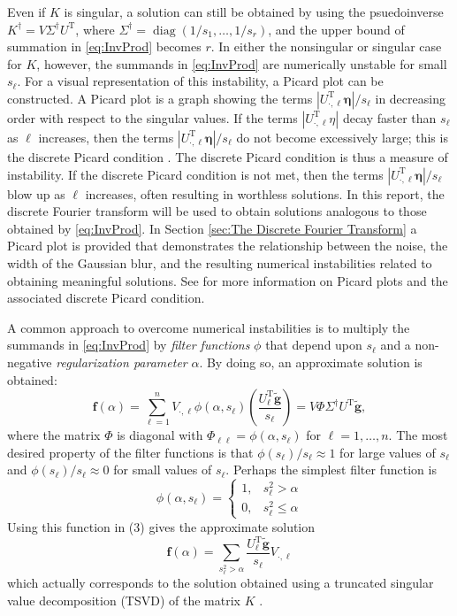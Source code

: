 \documentclass[12pt]{article}
\newcommand{\gnoiseVec}{\widetilde{\mathbf{g}}}	%
\newcommand{\kMat}{K}	%
\newcommand{\fVec}{\mathbf{f}}	%
\newcommand{\trans}{\mathrm{T}}	%
\newcommand{\diag}{\operatorname{diag}}	%
\newcommand{\regparam}{\alpha}
\newcommand{\filt}{\phi}
\newcommand{\noise}{\eta}	%
\newcommand{\noiseVec}{\bm{\noise}}	%
\newcommand{\singular}{s}	%
\begin{document}
Even if $\kMat$ is singular, a solution can still be obtained by using the psuedoinverse $\kMat^\dagger = V{\Sigma^\dagger}U^\trans$, where $\Sigma^\dagger = \diag(1/\singular_1,\ldots,1/\singular_r)$, and the upper bound of summation in \eqref{eq:InvProd} becomes $r$. In either the nonsingular or singular case for $\kMat$, however, the summands in \eqref{eq:InvProd} are numerically unstable for small $\singular_\ell$. For a visual representation of this instability, a Picard plot can be constructed. A Picard plot is a graph showing the terms $|U^\trans_{\cdot,\ell}\noiseVec|/\singular_\ell$ in decreasing order with respect to the singular values. If the terms $|U^\trans_{\cdot,\ell}\noise|$ decay faster than $\singular_\ell$ as $\ell$ increases, then the terms $|U^\trans_{\cdot,\ell}\noiseVec|/\singular_\ell$ do not become excessively large; this is the discrete Picard condition \cite{ABT}. The discrete Picard condition is thus a measure of instability. If the discrete Picard condition is not met, then the terms $|U^\trans_{\cdot,\ell}\noiseVec|/\singular_\ell$ blow up as $\ell$ increases, often resulting in worthless solutions. In this report, the discrete Fourier transform will be used to obtain solutions analogous to those obtained by \eqref{eq:InvProd}. In Section \ref{sec:The Discrete Fourier Transform} a Picard plot is provided that demonstrates the relationship between the noise, the width of the Gaussian blur, and the resulting numerical instabilities related to obtaining meaningful solutions. See \cite{Hansen1990} for more information on Picard plots and the associated discrete Picard condition. \par 
A common approach to overcome numerical instabilities is to multiply the summands in \eqref{eq:InvProd} by \textit{filter functions} $\filt$ that depend upon $\singular_\ell$ and a non-negative \textit{regularization parameter} $\regparam$. By doing so, an approximate solution is obtained:
\begin{equation}
\fVec(\regparam) = \sum_{\ell = 1}^n V_{\cdot,\ell}\filt(\regparam,\singular_\ell)\left(\frac{{U^\trans_\ell}\gnoiseVec}{\singular_\ell}\right) = V\Phi\Sigma^\dagger U^\trans\gnoiseVec,
\label{eq:ApproxSol}
\end{equation}
where the matrix $\Phi$ is diagonal with $\Phi_{\ell\ell} = \filt(\regparam,\singular_\ell)$ for $\ell = 1,\ldots,n$. The most desired property of the filter functions is that $\filt(\singular_\ell)/\singular_\ell \approx 1$  for large values of $\singular_\ell$ and $\filt(\singular_\ell)/\singular_\ell \approx 0$ for small values of $\singular_\ell$.  Perhaps the simplest filter function is
\[\filt(\regparam,\singular_\ell) = \begin{cases}
1, & \singular_\ell^2 > \regparam \\
0, & \singular_\ell^2 \leq \regparam
\end{cases}\]
Using this function in (3) gives the approximate solution
\[\fVec(\regparam) = \sum_{\singular_\ell^2 > \regparam} \frac{{U^\trans_\ell}\gnoiseVec}{\singular_\ell}V_{\cdot,\ell}\]
which actually corresponds to the solution obtained using a truncated singular value decomposition (TSVD) of the matrix $\kMat$ \cite{Vogel:2002}. \par
\end{document}

